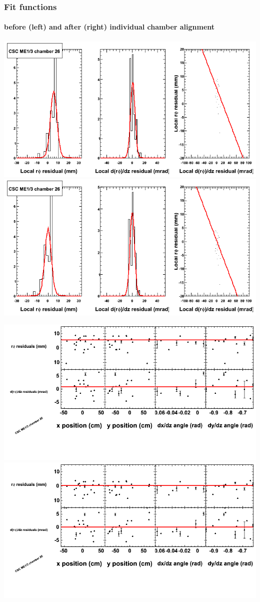 \documentclass[compress]{beamer}
\begin{document}
\begin{frame}
\frametitle{Fit functions}
\framesubtitle{before (left) and after (right) individual chamber alignment}
\includegraphics[width=0.5\linewidth]{ringfits_3dof/beforefit_MEp13_26_bellcurve.png} \includegraphics[width=0.5\linewidth]{ringfits_3dof/afterfit_MEp13_26_bellcurve.png}

\includegraphics[width=0.5\linewidth]{ringfits_3dof/beforefit_MEp13_26_polynomials.png} \includegraphics[width=0.5\linewidth]{ringfits_3dof/afterfit_MEp13_26_polynomials.png}
\end{frame}
\end{document}
